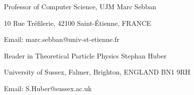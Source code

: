 \begin{multicols}{2}
\begin{cventries}
	\cventry
	{Professor of Computer Science, UJM}
	{Marc Sebban}
	{}
	{}
	{
		\begin{cvitems}
			\item {10 Rue Tréfilerie, 42100 Saint-Étienne, FRANCE}
			\item{Email: marc.sebban@univ-st-etienne.fr}
		\end{cvitems}
	}
	\newline
	\newline
	\cventry
	{Reader in Theoretical Particle Physics}
	{Stephan Huber}
	{}
	{}
	{
		\begin{cvitems}
			\item {University of Sussex, Falmer, Brighton, ENGLAND BN1 9RH}
			\item{Email: S.Huber@sussex.ac.uk}
		\end{cvitems}
	}

\end{cventries}

\end{multicols}
